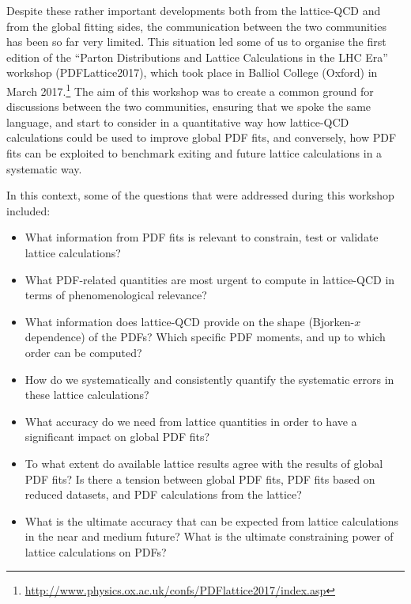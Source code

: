 Despite these rather important developments both from the lattice-QCD
and from the global fitting sides,
the communication between the
two communities has been so far very limited.
%
This situation led some of us
to organise the first edition of the
``Parton Distributions and Lattice Calculations in the LHC Era''
workshop (PDFLattice2017), which took
place in Balliol College (Oxford) in March
2017.\footnote{\url{http://www.physics.ox.ac.uk/confs/PDFlattice2017/index.asp}}
%
The aim of this workshop was to create a common ground for discussions
between the two communities, ensuring that we spoke the same language,
and start to consider in a quantitative way how lattice-QCD calculations could be used
to improve global PDF fits, and conversely, how PDF fits can be exploited to benchmark
exiting and future lattice calculations in a systematic way.

In this context, some of the questions that were addressed during this workshop
included:
\begin{itemize}
\item What information from PDF fits is relevant to constrain, test or validate lattice calculations?

\item What PDF-related quantities are most urgent
  to compute in lattice-QCD in terms of phenomenological relevance?

\item What information does lattice-QCD provide on the
  shape (Bjorken-$x$ dependence) of the PDFs? Which specific
  PDF moments,
  and up to which order can be computed?
  
\item How do we systematically and consistently quantify the systematic errors in these lattice calculations?

\item What accuracy do we need from lattice quantities 
  in order to have a significant impact on global PDF fits?

\item To what extent do available lattice results agree with the results of
  global PDF fits? Is there a tension between global PDF fits, PDF
  fits based on reduced datasets, and PDF calculations from the lattice?

  \item What is the ultimate accuracy that can be expected from lattice
calculations in the near and medium future? What is the ultimate
constraining power of lattice calculations on PDFs?

\end{itemize}

